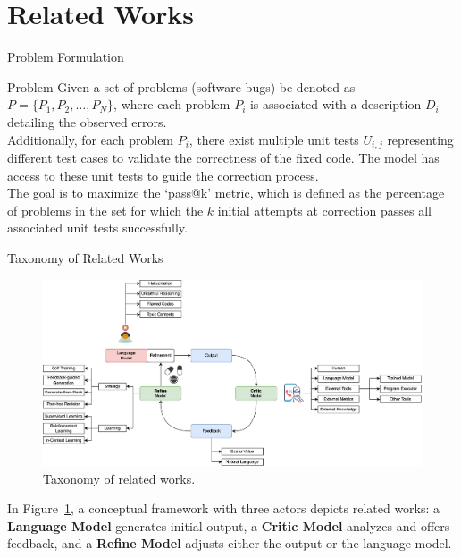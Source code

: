 \section{Related Works}

\begin{frame}{Problem Formulation}
    \begin{block}{Problem}
        Given a set of problems (software bugs) be denoted as \( P = \{P_1, P_2, \ldots, P_N\} \), where each problem \( P_i \) is associated with a description \( D_i \) detailing the observed errors.\\

        Additionally, for each problem \( P_i \), there exist multiple unit tests \( U_{i,j} \) representing different test cases to validate the correctness of the fixed code. The model has access to these unit tests to guide the correction process.\\

        The goal is to maximize the `pass@k' metric, which is defined as the percentage of problems in the set for which the $k$ initial attempts at correction passes all associated unit tests successfully.
    \end{block}
\end{frame}

\begin{frame}{Taxonomy of Related Works}
    \begin{figure}
        \centering
        \includegraphics[scale=0.045]{img/taxonomy}
        \caption{Taxonomy of related works.}\label{fig:taxonomy}
    \end{figure}
    In Figure~\ref{fig:taxonomy}, a conceptual framework with three actors depicts related works: a \textbf{Language Model} generates initial output, a \textbf{Critic Model} analyzes and offers feedback, and a \textbf{Refine Model} adjusts either the output or the language model.
\end{frame}

